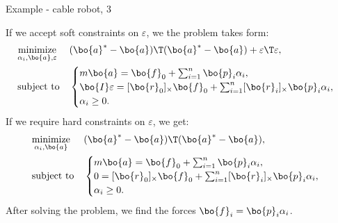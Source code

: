 \begin{frame}{Example - cable robot, 3}
	\begin{flushleft}
		
		If we accept soft constraints on $\varepsilon$, we the problem takes form:
		\begin{equation}
			\begin{aligned}
				& \underset{\alpha_i, \bo{a}, \varepsilon}{\text{minimize}}
				& & (\bo{a}^* - \bo{a})\T (\bo{a}^* - \bo{a}) + \varepsilon\T \varepsilon, 
				\\
				& \text{subject to}
				& & \begin{cases}
					m \bo{a} = \bo{f}_0 + \sum_{i = 1}^{n} \bo{p}_i \alpha_i,
					\\
					\bo{I} \varepsilon = [\bo{r}_0]_\times \bo{f}_0 + \sum_{i = 1}^{n} [\bo{r}_i]_\times \bo{p}_i \alpha_i,
					\\
					\alpha_i \geq 0.
				\end{cases}
			\end{aligned}
		\end{equation}
		If we require hard constraints on $\varepsilon$, we get:
		\begin{equation}
			\begin{aligned}
				& \underset{\alpha_i, \bo{a}}{\text{minimize}}
				& & (\bo{a}^* - \bo{a})\T (\bo{a}^* - \bo{a}), 
				\\
				& \text{subject to}
				& & \begin{cases}
					m \bo{a} = \bo{f}_0 + \sum_{i = 1}^{n} \bo{p}_i \alpha_i,
					\\
					0 = [\bo{r}_0]_\times \bo{f}_0 + \sum_{i = 1}^{n} [\bo{r}_i]_\times \bo{p}_i \alpha_i,
					\\
					\alpha_i \geq 0.
				\end{cases}
			\end{aligned}
		\end{equation}
		After solving the problem, we find the forces $\bo{f}_i  = \bo{p}_i \alpha_i$. 
		
		
	\end{flushleft}
\end{frame}